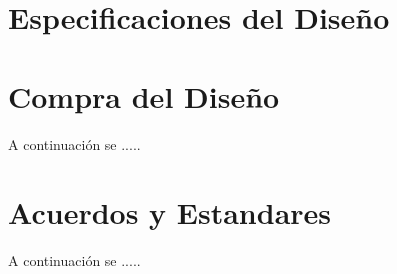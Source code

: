 

\section{Especificaciones del Diseño}



\section{Compra del Diseño}

A continuaci\'on se .....

\section{Acuerdos y Estandares}

A continuaci\'on se .....



